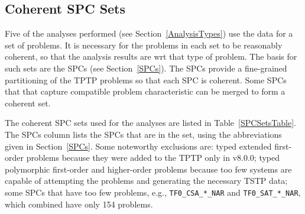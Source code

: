 \documentclass[runningheads]{llncs}
\begin{document}
\subsection{Coherent SPC Sets}
\label{SPCSets}

Five of the analyses performed (see Section~\ref{AnalysisTypes}) use the data for a set of 
problems.
It is necessary for the problems in each set to be 
reasonably coherent, so that the analysis results are wrt that type of problem.
The basis for such sets are the SPCs (see Section~\ref{SPCs}).
The SPCs provide a fine-grained partitioning of the TPTP problems so that each SPC is coherent.
Some SPCs that that capture compatible problem characteristic can be merged to form a coherent set.

The coherent SPC sets used for the analyses are listed in Table~\ref{SPCSetsTable}.
The SPCs column lists the SPCs that are in the set, using the abbreviations given in 
Section~\ref{SPCs}.
Some noteworthy exclusions are:
typed extended first-order problems because they were added to the TPTP only in v8.0.0;
typed polymorphic first-order and higher-order problems because too few systems are 
capable of attempting the problems and generating the necessary TSTP data;
some SPCs that have too few problems, e.g., {\tt TF0\_CSA\_*\_NAR} and {\tt TF0\_SAT\_*\_NAR},
which combined have only 154 problems.
\end{document}
